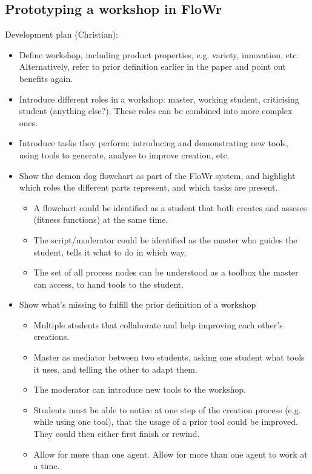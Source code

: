 \subsection{Prototyping a workshop in FloWr}
Development plan (Christian):
\begin{itemize}
	\item Define workshop, including product properties, e.g. variety, innovation, etc. Alternatively, refer to prior definition earlier in the paper and point out benefits again.
	\item Introduce different roles in a workshop: master, working student, criticising student (anything else?). These roles can be combined into more complex ones. 
	\item Introduce tasks they perform: introducing and demonstrating new tools, using tools to generate, analyse to improve creation, etc.
	\item Show the demon dog flowchart as part of the FloWr system, and highlight which roles the different parts represent, and which tasks are present.
	\begin{itemize}
		\item A flowchart could be identified as a student that both creates and asseses (fitness functions) at the same time.
		\item The script/moderator could be identified as the master who guides the student, tells it what to do in which way.
		\item The set of all process nodes can be understood as a toolbox the master can access, to hand tools to the student.
	\end{itemize}
	\item Show what's missing to fulfill the prior definition of a workshop
	\begin{itemize}
		\item Multiple students that collaborate and help improving each other's creations.
		\item Master as mediator between two students, asking one student what tools it uses, and telling the other to adapt them.
		\item The moderator can introduce new tools to the workshop.
		\item Students must be able to notice at one step of the creation process (e.g. while using one tool), that the usage of a prior tool could be improved. They could then either first finish or rewind.
		\item Allow for more than one agent. Allow for more than one agent to work at a time.

\end{itemize}
\end{itemize}
